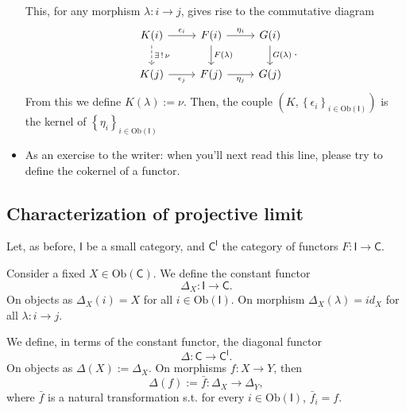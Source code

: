 \begin{prop}
\begin{itemize}
			This, for any morphism $\lambda: i \to j$, gives rise to the commutative diagram
			\begin{equation}
			\begin{tikzcd}
				K(i) \arrow[d, "\exists\, !\, \nu", dashrightarrow] \arrow[r, "\epsilon_i", rightarrow] &
				F(i) \arrow[r, "\eta_i", rightarrow] \arrow[d, "F(\lambda)", rightarrow] &
				G(i) \arrow[d, "G(\lambda)", rightarrow] \\
				K(j) \arrow[r, "\epsilon_j"', rightarrow] &
				F(j) \arrow[r, "\eta_j"', rightarrow] &
				G(j)
			\end{tikzcd}
			.\end{equation} 
			From this we define $K(\lambda) := \nu$.
			Then, the couple $\left(K, \left\{ \epsilon_i \right\}_{i \in \mathrm{Ob} \left(\mathsf{I}\right)} \right)$
			is the kernel of $\left\{ \eta_i \right\}_{i \in \mathrm{Ob} \left(\mathsf{I}\right)} $
		\item As an exercise to the writer: when you'll next read this line,
			please try to define the cokernel of a functor.
	\end{itemize}
\end{prop} 

\subsection{Characterization of projective limit}
Let, as before, $\mathsf{I}$ be a small category, and $\mathsf{C}^{\mathsf{I}}$ the category of functors $F: \mathsf{I} \to \mathsf{C}$.

\begin{defn}
	Consider a fixed $X \in \mathrm{Ob} \left(\mathsf{C}\right)$.
	We define the constant functor
	\begin{equation}
	\Delta_X: \mathsf{I} \to \mathsf{C}
	.\end{equation} 
	On objects as $\Delta_X(i) = X$ for all $i \in \mathrm{Ob} \left(\mathsf{I}\right)$.
	On morphism $\Delta_X(\lambda) = id_X$ for all $\lambda: i \to j$.
\end{defn}

\begin{defn}
	We define, in terms of the constant functor, the diagonal functor
	 \begin{equation}
	\Delta: \mathsf{C} \to \mathsf{C}^{\mathsf{I}}
	.\end{equation} 
	On objects as $\Delta(X) := \Delta_X$.
	On morphisms $f: X \to Y$, then
	\begin{equation}
		\Delta(f) := \bar{f}: \Delta_X \to \Delta_Y
	,\end{equation} 
	where $\bar{f}$ is a natural transformation s.t. for every $i \in \mathrm{Ob} \left(\mathsf{I}\right)$, $\bar{f}_i = f$.
\end{defn}

